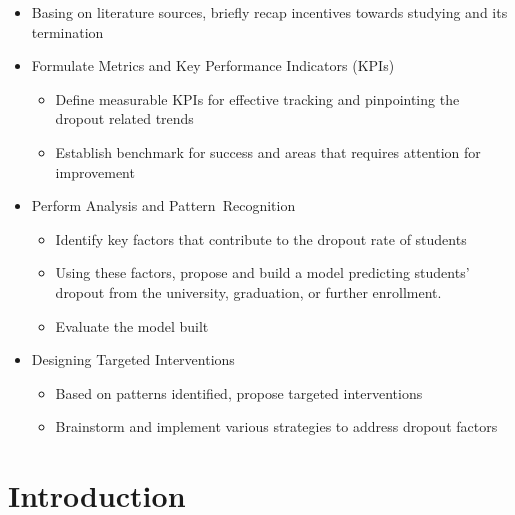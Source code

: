 \documentclass[
  letterpaper,
  DIV=11,
  numbers=noendperiod]{scrartcl}
\providecommand{\tightlist}{%
  \setlength{\itemsep}{0pt}\setlength{\parskip}{0pt}}\usepackage{longtable,booktabs,array}
\begin{document}
\begin{itemize}
\tightlist
\item
  Basing on literature sources, briefly recap incentives towards
  studying and its termination
\item
  Formulate Metrics and Key Performance Indicators (KPIs)

  \begin{itemize}
  \tightlist
  \item
    Define measurable KPIs for effective tracking and pinpointing the
    dropout related trends
  \item
    Establish benchmark for success and areas that requires attention
    for improvement
  \end{itemize}
\item
  Perform Analysis and Pattern~Recognition

  \begin{itemize}
  \tightlist
  \item
    Identify key factors that contribute to the dropout rate of students
  \item
    Using these factors, propose and build a model predicting students'
    dropout from the university, graduation, or further enrollment.
  \item
    Evaluate the model built
  \end{itemize}
\item
  Designing Targeted Interventions

  \begin{itemize}
  \tightlist
  \item
    Based on patterns identified, propose targeted interventions
  \item
    Brainstorm and implement various strategies to address dropout
    factors
  \end{itemize}
\end{itemize}

\hypertarget{introduction}{%
\section{Introduction}\label{introduction}}
\end{document}
